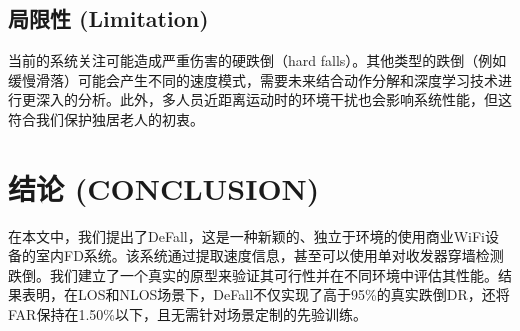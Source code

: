 \documentclass[journal]{IEEEtran}
\begin{document}
\begin{table}[htbp]
\centering
\caption{DeFall 的处理时间 (PROCESSING TIME OF DEFALL)}
\end{table}

\subsection{局限性 (Limitation)}
当前的系统关注可能造成严重伤害的硬跌倒（hard falls）。其他类型的跌倒（例如缓慢滑落）可能会产生不同的速度模式，需要未来结合动作分解和深度学习技术进行更深入的分析。此外，多人员近距离运动时的环境干扰也会影响系统性能，但这符合我们保护独居老人的初衷。

\section{结论 (CONCLUSION)}
在本文中，我们提出了DeFall，这是一种新颖的、独立于环境的使用商业WiFi设备的室内FD系统。该系统通过提取速度信息，甚至可以使用单对收发器穿墙检测跌倒。我们建立了一个真实的原型来验证其可行性并在不同环境中评估其性能。结果表明，在LOS和NLOS场景下，DeFall不仅实现了高于95\%的真实跌倒DR，还将FAR保持在1.50\%以下，且无需针对场景定制的先验训练。
\end{document}
